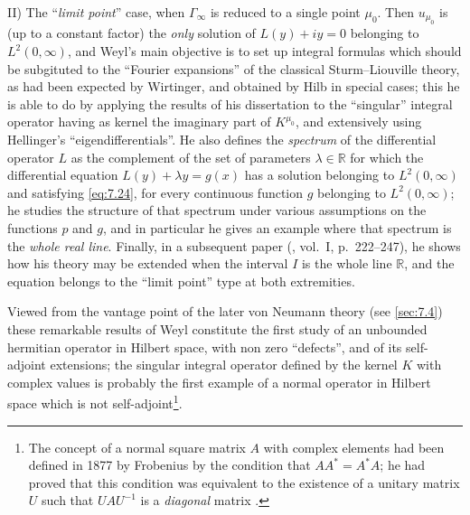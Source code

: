 \documentclass[12pt,a4paper,leqno,twoside]{extbook}
\newcommand{\R}{\mathbb{R}}
\begin{document}
II) The ``\emph{limit point}'' case, when \(\Gamma_\infty\) is reduced to a single point \(\mu_0\). Then \(u_{\mu_0}\) is (up to a constant factor) the \emph{only} solution of \(L(y) + iy = 0\) belonging to \(L^2(0,\infty)\), and Weyl's main objective is to set up integral formulas which should be subgituted to the ``Fourier expansions'' of the classical Sturm--Liouville theory, as had been expected by Wirtinger, and obtained by Hilb in special cases; this he is able to do by applying the results of his dissertation to the ``singular'' integral operator having as kernel the imaginary part of \(K^{\mu_0}\), and extensively using Hellinger's ``eigendifferentials''. He also defines the \emph{spectrum} of the differential operator \(L\) as the complement of the set of parameters \(\lambda \in \R\) for which the differential equation \(L(y) + \lambda y = g(x)\) has a solution belonging to \(L^2(0,\infty)\) and satisfying \eqref{eq:7.24}, for every continuous function \(g\) belonging to \(L^2(0,\infty)\); he studies the structure of that spectrum under various assumptions on the functions \(p\) and \(g\), and in particular he gives an example where that spectrum is the \emph{whole real line}. Finally, in a subsequent paper (\cite{227}, vol.~I, p.~222--247), he shows how his theory may be extended when the interval \(I\) is the whole line \(\R\), and the equation belongs to the ``limit point'' type at both extremities.

Viewed from the vantage point of the later von Neumann theory (see \ref{sec:7.4}) these remarkable results of Weyl constitute the first study of an unbounded hermitian operator in Hilbert space, with non zero ``defects'', and of its self-adjoint extensions; the singular integral operator defined by the kernel \(K\) with complex values is probably the first example of a normal operator in Hilbert space which is not self-adjoint\footnote{The concept of a normal square matrix \(A\) with complex elements had been defined in 1877 by Frobenius by the condition that \(AA^* = A^*A\); he had proved that this condition was equivalent to the existence of a unitary matrix \(U\) such that \(UAU^{-1}\) is a \emph{diagonal} matrix \cite[vol.~I, p.~391]{078}.}.
\end{document}
